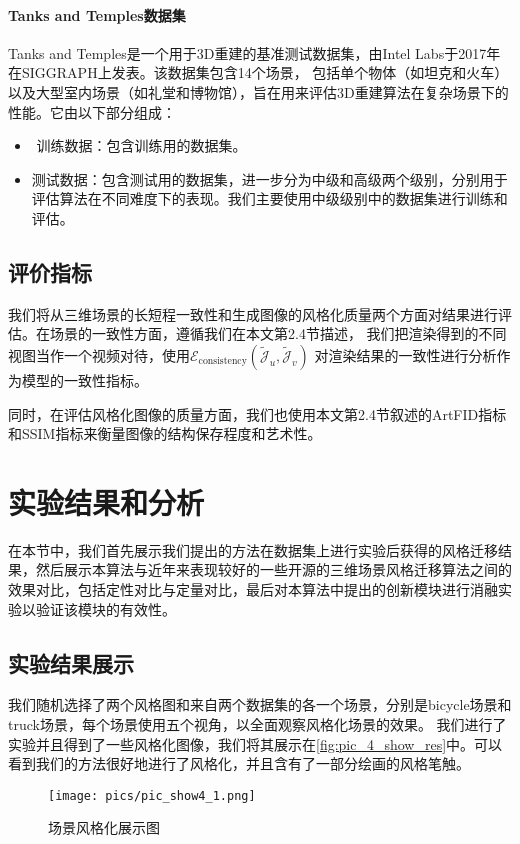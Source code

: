 \paragraph{Tanks and Temples数据集}
‌Tanks and Temples‌是一个用于3D重建的基准测试数据集，由Intel Labs于2017年在SIGGRAPH上发表。该数据集包含14个场景，
包括单个物体（如坦克和火车）以及大型室内场景（如礼堂和博物馆），旨在用来评估3D重建算法在复杂场景下的性能‌。它由以下部分组成：
\begin{itemize}
    \item‌  训练数据：包含训练用的数据集。
    \item 测试数据：包含测试用的数据集，进一步分为中级和高级‌两个级别，分别用于评估算法在不同难度下的表现‌。我们主要使用中级级别中的数据集进行训练和评估。
\end{itemize}
\subsection{评价指标}
我们将从三维场景的长短程一致性和生成图像的风格化质量两个方面对结果进行评估。在场景的一致性方面，遵循我们在本文第2.4节描述，
我们把渲染得到的不同视图当作一个视频对待，使用\(\mathcal{E}_\text{consistency}(\tilde{\mathcal{J}}_u,\tilde{\mathcal{J}}_v)\)
对渲染结果的一致性进行分析作为模型的一致性指标。
\par 同时，在评估风格化图像的质量方面，我们也使用本文第2.4节叙述的ArtFID指标和SSIM指标来衡量图像的结构保存程度和艺术性。
\section{实验结果和分析}
在本节中，我们首先展示我们提出的方法在数据集上进行实验后获得的风格迁移结果，然后展示本算法与近年来表现较好的一些开源的三维场景风格迁移算法之间的效果对比，包括定性对比与定量对比，最后对本算法中提出的创新模块进行消融实验以验证该模块的有效性。
\subsection{实验结果展示}
我们随机选择了两个风格图和来自两个数据集的各一个场景，分别是bicycle场景和truck场景，每个场景使用五个视角，以全面观察风格化场景的效果。
我们进行了实验并且得到了一些风格化图像，我们将其展示在\autoref{fig:pic_4_show_res}中。可以看到我们的方法很好地进行了风格化，并且含有了一部分绘画的风格笔触。
\begin{figure}[htbp]
    \centering
    \texttt{[image: pics/pic\_show4\_1.png]}
    \caption{\label{fig:pic_4_show_res}场景风格化展示图}
\end{figure}
